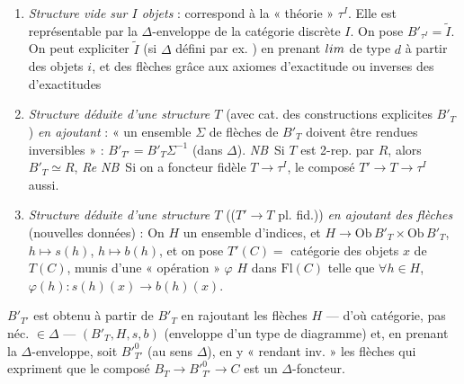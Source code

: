 \documentclass[11pt,a4paper]{article}
\begin{document}
\begin{enumerate}
  \item[a)] \emph{Structure vide sur $I$ objets} : correspond à
    \struck{\ill{}} la « théorie » $\tau^{I}$. Elle est représentable par
      la $\Delta$-enveloppe  de
    la catégorie discrète $I$. On pose $B'_{\tau^{I}} = \tilde{I}$. On peut
    expliciter $\tilde{I}$ (si $\Delta$ défini par ex. ) en \struck{\ill{}} prenant $\varprojlim$ de type
    $d$ à partir des objets $i$, et des  flèches
    grâce aux axiomes d'exactitude ou inverses des \ill{} d'exactitudes
    \struck{\ill{}} 
  \item[b)] \emph{Structure déduite d'une structure $T$} (avec cat.
    des constructions explicites $B'_{T}$) \emph{en ajoutant}
      : « un
    ensemble $\Sigma$ de flèches de $B'_{T}$ doivent être rendues
    inversibles » : $B'_{T'} = B'_{T}\Sigma^{-1}$ (dans $\Delta$).
    \emph{NB}\ Si  $T$ est 2-rep. par $R$, alors $B'_{T}
    \simeq R$,   \emph{Re NB}\ Si on a
    foncteur fidèle $T \to \tau^{I}$, le composé $T' \to T \to \tau^{I}$
    aussi.
  \item[c)] \emph{Structure déduite d'une structure $T$} (($T' \to
    T$ pl. fid.)) \emph{en ajoutant des flèches} (nouvelles
    données) :  On
     $H$ un ensemble d'indices, et $H \to
    \mathrm{Ob}\,B'_{T} \times \mathrm{Ob}\,B'_{T}$, $h \mapsto s(h)$,
    $h \mapsto b(h)$, et on pose $T'(C) = $ catégorie des objets $x$ de
    $T(C)$, munis d'une « opération » $\varphi$  $H$ dans
    $\mathrm{Fl}(C)$ telle que $\forall h \in H$, $\varphi(h) : s(h)(x)
    \to b(h)(x)$.
\end{enumerate}

$B'_{T'}$ est obtenu à partir de $B'_{T}$ en rajoutant les flèches $H$ —
d'où catégorie, pas néc. $\in \Delta$ — \struck{\ill{}} $(B'_{T}, H, s,
b)$ (enveloppe d'un type de diagramme) et, en prenant la
$\Delta$-enveloppe, soit $B'^{0}_{T'}$ (au sens $\Delta$), en y « rendant
inv. » les flèches qui expriment que le composé $B_{T} \to B'^{0}_{T'}
\to C$ est un $\Delta$-foncteur. 
\end{document}
